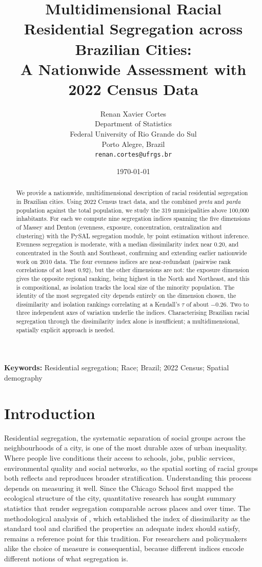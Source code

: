\documentclass[12pt,a4paper]{article}
\title{Multidimensional Racial Residential Segregation across Brazilian Cities:\\
A Nationwide Assessment with 2022 Census Data}
\author{
Renan Xavier Cortes\\
Department of Statistics\\
Federal University of Rio Grande do Sul\\
Porto Alegre, Brazil\\
\texttt{renan.cortes@ufrgs.br}
}
\date{\today}
\begin{document}
\maketitle

\begin{abstract}
We provide a nationwide, multidimensional description of racial residential segregation in Brazilian cities. Using 2022 Census tract data, and the combined \emph{preta} and \emph{parda} population against the total population, we study the 319 municipalities above 100{,}000 inhabitants. For each we compute nine segregation indices spanning the five dimensions of Massey and Denton (evenness, exposure, concentration, centralization and clustering) with the PySAL segregation module, by point estimation without inference. Evenness segregation is moderate, with a median dissimilarity index near 0.20, and concentrated in the South and Southeast, confirming and extending earlier nationwide work on 2010 data. The four evenness indices are near-redundant (pairwise rank correlations of at least 0.92), but the other dimensions are not: the exposure dimension gives the opposite regional ranking, being highest in the North and Northeast, and this is compositional, as isolation tracks the local size of the minority population. The identity of the most segregated city depends entirely on the dimension chosen, the dissimilarity and isolation rankings correlating at a Kendall's $\tau$ of about $-0.26$. Two to three independent axes of variation underlie the indices. Characterising Brazilian racial segregation through the dissimilarity index alone is insufficient; a multidimensional, spatially explicit approach is needed.
\end{abstract}

\noindent\textbf{Keywords:} Residential segregation; Race; Brazil; 2022 Census; Spatial demography

\section{Introduction}\label{sec:intro}

Residential segregation, the systematic separation of social groups across the neighbourhoods of a city, is one of the most durable axes of urban inequality. Where people live conditions their access to schools, jobs, public services, environmental quality and social networks, so the spatial sorting of racial groups both reflects and reproduces broader stratification. Understanding this process depends on measuring it well. Since the Chicago School first mapped the ecological structure of the city, quantitative research has sought summary statistics that render segregation comparable across places and over time. The methodological analysis of \citet{duncan1955methodological}, which established the index of dissimilarity as the standard tool and clarified the properties an adequate index should satisfy, remains a reference point for this tradition. For researchers and policymakers alike the choice of measure is consequential, because different indices encode different notions of what segregation is.
\end{document}
